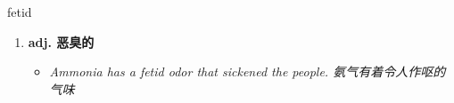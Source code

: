 
\begin{frame}
{\huge fetid}
\begin{center}
\begin{enumerate}\Large
  \item \textbf{adj. 恶臭的}
  \begin{itemize}
    \item \em{\Large{Ammonia has a fetid odor that sickened the people. 氨气有着令人作呕的气味}}
  \end{itemize}
\end{enumerate}
\end{center}
\end{frame}
